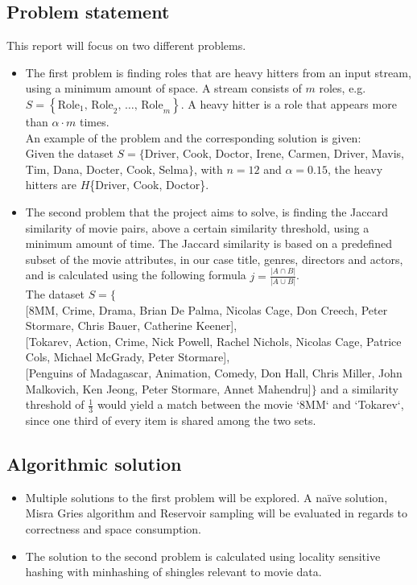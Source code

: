 \subsection{Problem statement}
	This report will focus on two different problems.
\begin{itemize}
	\item The first problem is finding roles that are heavy hitters from an input stream, using a minimum amount of space. A stream consists of \(m\) roles, e.g. \(S=\left\{\textrm{Role}_1 \textrm{, Role}_2 \textrm{, } \dots \textrm{, Role}_m\right\}\). A heavy hitter is a role that appears more than \(\alpha \cdot m\) times.\\
	An example of the problem and the corresponding solution is given: \\
	Given the dataset \(S = \{\)Driver, Cook, Doctor, Irene, Carmen, Driver, Mavis, Tim, Dana, Docter, Cook, Selma\(\}\), with \(n=12\) and \(\alpha=0.15\), the heavy hitters are \(H\)\{Driver, Cook, Doctor\}.
	\item The second problem that the project aims to solve, is finding the Jaccard similarity of movie pairs, above a certain similarity threshold, using a minimum amount of time. The Jaccard similarity is based on a predefined subset of the movie attributes, in our case title, genres, directors and actors, and is calculated using the following formula \(j = \frac{|A \cap B|}{|A \cup B|}\). \\
	The dataset \(S = \{\) \\
		{[}8MM, Crime, Drama, Brian De Palma, Nicolas Cage, Don Creech, Peter Stormare, Chris Bauer, Catherine Keener{]}, \\
		{[}Tokarev, Action, Crime, Nick Powell, Rachel Nichols, Nicolas Cage, Patrice Cols, Michael McGrady, Peter Stormare{]}, \\
		{[}Penguins of Madagascar, Animation, Comedy, Don Hall, Chris Miller, John Malkovich, Ken Jeong, Peter Stormare, Annet Mahendru{]}\(\}\)
	and a similarity threshold of \(\frac{1}{3}\) would yield a match between the movie `8MM` and `Tokarev`, since one third of every item is shared among the two sets.
	
\end{itemize}

\subsection{Algorithmic solution}
\begin{itemize}
	\item Multiple solutions to the first problem will be explored. A naïve solution, Misra Gries algorithm and Reservoir sampling will be evaluated in regards to correctness and space consumption.
	\item The solution to the second problem is calculated using locality sensitive hashing with minhashing of shingles relevant to movie data.
\end{itemize}

